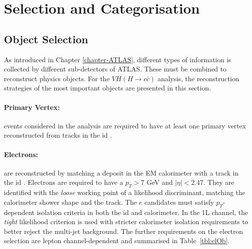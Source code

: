 
\section{Selection and Categorisation}\label{sec-selectionandcat}
\subsection{Object Selection}\label{sec-obj}
As introduced in Chapter \ref{chapter-ATLAS}, different types of information is collected by different sub-detectors of ATLAS. These must be combined to reconstruct physics objects. For the $VH (H\rightarrow c\bar{c})$ analysis, the reconstruction strategies of the most important objects are presented in this section. 

\paragraph{Primary Vertex:} events considered in the analysis are required to have at least one primary vertex reconstructed from tracks in the \gls{id} \cite{ATL-PHYS-PUB-2015-026}.

\paragraph{Electrons:} are reconstructed by matching a deposit in the EM calorimeter with a track in the \gls{id} \cite{Aaboud:2657964, Aad_2019}. Electrons are required to have a $p_T > 7$ GeV and $|\eta|<2.47$. They are identified with the \textit{loose} working point of a likelihood discriminant, matching the calorimeter shower shape and the track. The $e$ candidates must satisfy $p_T$-dependent isolation criteria in both the \gls{id} and calorimeter. In the 1L channel, the \textit{tight} likelihood criterion is used with stricter calorimeter isolation requirements to better reject the multi-jet background. The further requirements on the electron selection are lepton channel-dependent and summarised in Table~\ref{tbl:elOb}. %

\begin{table}[!htbp]
  \begin{center}
    \caption{Electron Selection requirements.} %
    \label{tbl:elOb}
  \end{center}
\end{table}

